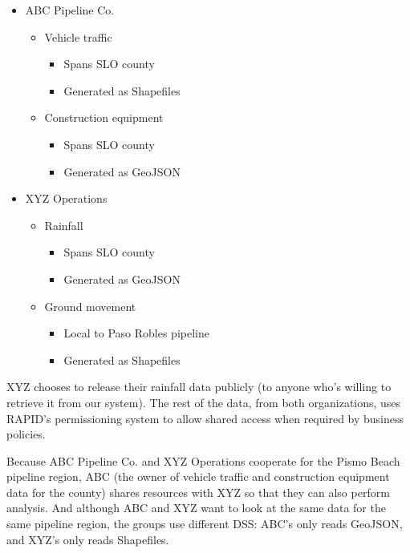 \begin{itemize}
 \item ABC Pipeline Co.
 \begin{itemize}
     \item Vehicle traffic
     \begin{itemize}
         \item Spans SLO county
         \item Generated as Shapefiles
     \end{itemize}
     \item Construction equipment
     \begin{itemize}
         \item Spans SLO county
         \item Generated as GeoJSON
     \end{itemize}
 \end{itemize}
 
 \item XYZ Operations
 \begin{itemize}
     \item Rainfall
     \begin{itemize}
         \item Spans SLO county
         \item Generated as GeoJSON
     \end{itemize}
     \item Ground movement
     \begin{itemize}
         \item Local to Paso Robles pipeline
         \item Generated as Shapefiles
     \end{itemize}
 \end{itemize}
\end{itemize}

XYZ chooses to release their rainfall data publicly (to anyone who's willing to retrieve it from our system). The rest of the data, from both organizations, uses RAPID's permissioning system to allow shared access when required by business policies.

Because ABC Pipeline Co. and XYZ Operations cooperate for the Pismo Beach pipeline region, ABC (the owner of vehicle traffic and construction equipment data for the county) shares resources with XYZ so that they can also perform analysis. And although ABC and XYZ want to look at the same data for the same pipeline region, the groups use different DSS: ABC's only reads GeoJSON, and XYZ's only reads Shapefiles.

